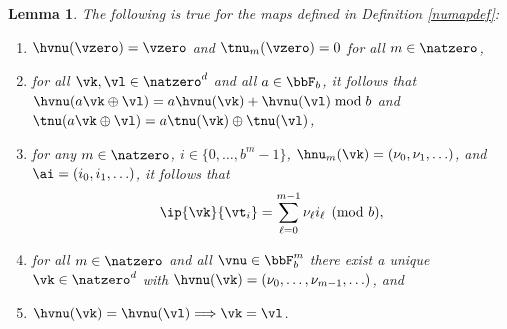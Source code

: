 \documentclass[]{elsarticle}
\newtheorem{lem}{Lemma}
\theoremstyle{definition}
\renewcommand{\bbK}{\natzero^d}
\begin{document}
\begin{lem} \label{numaplem} The following is true for the maps defined in Definition \ref{numapdef}:
\begin{enumerate}
\renewcommand{\labelenumi}{\alph{enumi})}

\item $\hvnu(\vzero)=\vzero$ and $\tnu_m(\vzero) = 0$ for all $m \in \natzero$,

\item for all $\vk, \vl \in \bbK$ and all $a \in \bbF_b$, it follows that $\hvnu(a\vk \oplus \vl)=a\hvnu(\vk) + \hvnu(\vl) \bmod b$ and $\tnu(a\vk \oplus \vl)=a\tnu(\vk) \oplus \tnu(\vl)$,

\item for any $m \in \natzero$, $i \in \{0, \ldots, b^m-1\}$,  $\hnu_m(\vk)=(\nu_0, \nu_1, \ldots)$, and $\ai=(i_0, i_1, \ldots)$, it follows that 
\begin{equation} \label{nuwisum}
\ip{\vk}{\vt_i} = \sum_{\ell=0}^{m-1} \nu_\ell i_{\ell} \pmod b,
\end{equation}

\item for all $m\in \natzero$ and all $\vnu \in \bbF_b^{m}$ there exist a unique $\vk \in \bbK$ with $\hvnu(\vk)=(\nu_0, \ldots, \nu_{m-1}, \ldots)$, and

\item $\hvnu(\vk)=\hvnu(\vl) \Longrightarrow \vk = \vl$.

\end{enumerate}
\end{lem}
\end{document}
